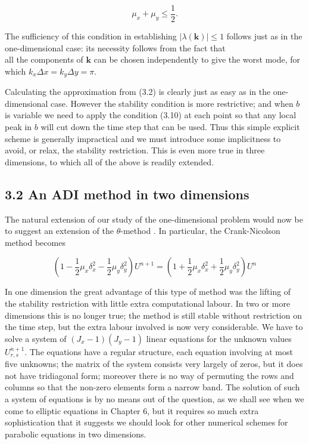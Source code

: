 \documentclass[10pt]{article}
\begin{document}
\[
\mu_{x}+\mu_{y} \leq \frac{1}{2} .
\]

The sufficiency of this condition in establishing \(|\lambda(\mathbf{k})| \leq 1\) follows just as in the one-dimensional case: its necessity follows from the fact that\\
all the components of \(\mathbf{k}\) can be chosen independently to give the worst mode, for which \(k_{x} \Delta x=k_{y} \Delta y=\pi\).

Calculating the approximation from (3.2) is clearly just as easy as in the one-dimensional case. However the stability condition is more restrictive; and when \(b\) is variable we need to apply the condition (3.10) at each point so that any local peak in \(b\) will cut down the time step that can be used. Thus this simple explicit scheme is generally impractical and we must introduce some implicitness to avoid, or relax, the stability restriction. This is even more true in three dimensions, to which all of the above is readily extended.

\subsection*{3.2 An ADI method in two dimensions}
The natural extension of our study of the one-dimensional problem would now be to suggest an extension of the \(\theta\)-method . In particular, the Crank-Nicolson method becomes

\[
\left(1-\frac{1}{2} \mu_{x} \delta_{x}^{2}-\frac{1}{2} \mu_{y} \delta_{y}^{2}\right) U^{n+1}=\left(1+\frac{1}{2} \mu_{x} \delta_{x}^{2}+\frac{1}{2} \mu_{y} \delta_{y}^{2}\right) U^{n}
\]

In one dimension the great advantage of this type of method was the lifting of the stability restriction with little extra computational labour. In two or more dimensions this is no longer true; the method is still stable without restriction on the time step, but the extra labour involved is now very considerable. We have to solve a system of \(\left(J_{x}-1\right)\left(J_{y}-1\right)\) linear equations for the unknown values \(U_{r, s}^{n+1}\). The equations have a regular structure, each equation involving at most five unknowns; the matrix of the system consists very largely of zeros, but it does not have tridiagonal form; moreover there is no way of permuting the rows and columns so that the non-zero elements form a narrow band. The solution of such a system of equations is by no means out of the question, as we shall see when we come to elliptic equations in Chapter 6, but it requires so much extra sophistication that it suggests we should look for other numerical schemes for parabolic equations in two dimensions.
\end{document}
